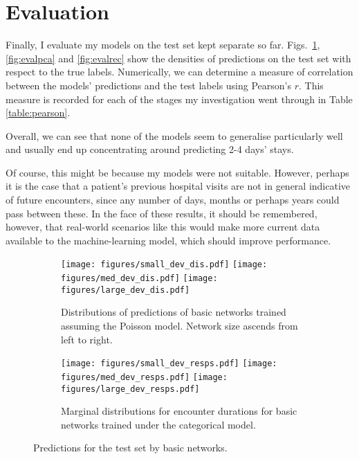 \documentclass[10pt, twoside, a4paper]{article}
\begin{document}
	\section{Evaluation}
	Finally, I evaluate my models on the test set kept separate so far. 
	Figs.\ \ref{fig:evalmlp}, \ref{fig:evalpca} and \ref{fig:evalrec} show the densities of 
	predictions on the test set with respect to the true labels. Numerically, we can determine a measure of correlation between 
	the models' predictions and the test labels using Pearson's $r$. This measure is 
	recorded for each of the stages my investigation went through in Table \ref{table:pearson}. 

	Overall, we can see that none of the models seem to generalise particularly well and usually end up concentrating around predicting 2-4 days' stays. 
	
	Of course, this might be because my models were not suitable. However, perhaps it is the case that a patient's
	previous hospital visits are not in general indicative of future encounters, since any number
	of days, months or perhaps years could pass between these. In the face of these results, 
	it should be remembered, however, that real-world scenarios like this would make more current data available to the machine-learning model, which should improve performance.

	\begin{figure}
	\begin{center}
	\begin{subfigure}[b]{17cm}
	\texttt{[image: figures/small\_dev\_dis.pdf]}
	\texttt{[image: figures/med\_dev\_dis.pdf]}
	\texttt{[image: figures/large\_dev\_dis.pdf]}
	\caption{Distributions of predictions of basic networks trained assuming the Poisson model. Network size ascends from left to right.}
	\end{subfigure}
	\begin{subfigure}[b]{17cm}
	\texttt{[image: figures/small\_dev\_resps.pdf]}
	\texttt{[image: figures/med\_dev\_resps.pdf]}
	\texttt{[image: figures/large\_dev\_resps.pdf]}
	\caption{Marginal distributions for encounter durations for basic networks trained under the categorical model.}
	\end{subfigure}
	\end{center}
	\caption{Predictions for the test set by basic networks.}
	\label{fig:evalmlp}
	\end{figure}
\end{document}
